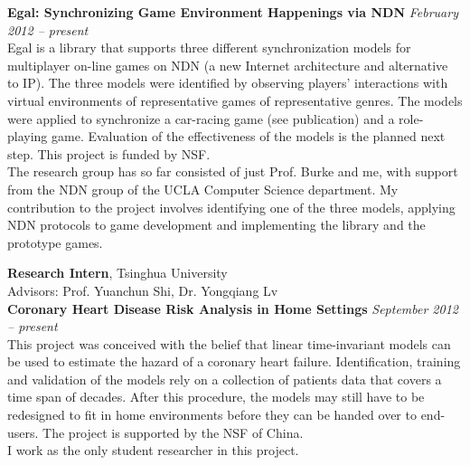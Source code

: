 \documentclass[margin,line]{resume}
\begin{document}
\begin{resume}
    \textbf{Egal: Synchronizing Game Environment Happenings via NDN} \hfill \textsl{February 2012 -- present}\\
    Egal is a library that supports three different synchronization models for multiplayer on-line games on NDN (a new Internet architecture and alternative to IP). The three models were identified by observing players' interactions with virtual environments of representative games of representative genres. The models were applied to synchronize a car-racing game (see publication) and a role-playing game. Evaluation of the effectiveness of the models is the planned next step. This project is funded by NSF. \\
   The research group has so far consisted of just Prof. Burke and me, with support from the NDN group of the UCLA Computer Science department. My contribution to the project involves identifying one of the three models, applying NDN protocols to game development and implementing the library and the prototype games.

    \textbf{Research Intern}, Tsinghua University \\
    Advisors: Prof. Yuanchun Shi, Dr. Yongqiang Lv \vspace{2mm}\\%
    \textbf{Coronary Heart Disease Risk Analysis in Home Settings} \hfill \textsl{September 2012 -- present}\\
    This project was conceived with the belief that linear time-invariant models can be used to estimate the hazard of a coronary heart failure. Identification, training and validation of the models rely on a collection of patients data that covers a time span of decades. After this procedure, the models may still have to be redesigned to fit in home environments before they can be handed over to end-users. The project is supported by the NSF of China. \\
    I work as the only student researcher in this project.\\
   
   \vspace{5cm}
   
    


\end{resume}
\end{document}
